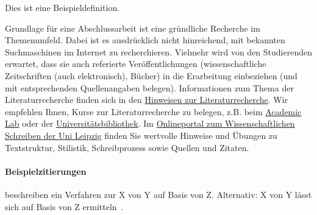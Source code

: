 \begin{temp}
\begin{definition}[Beispieldefinition]
Dies ist eine Beispieldefinition.
\end{definition}

Grundlage für eine Abschlussarbeit ist eine gründliche Recherche im Themenumfeld.
Dabei ist es ausdrücklich nicht hinreichend, mit bekannten Suchmaschinen im Internet zu recherchieren.
Vielmehr wird von den Studierenden erwartet, dass sie auch referierte Veröffentlichungen (wissenschaftliche Zeitschriften (auch elektronisch), Bücher) in die Erarbeitung einbeziehen (und mit entsprechenden Quellenangaben belegen).
Informationen zum Thema der Literaturrecherche finden sich in den \href{http://www.imise.uni-leipzig.de/Lehre/MedInf/Abschlussarbeiten/Literaturrecherche}{Hinweisen zur Literaturrecherche}.
Wir empfehlen Ihnen, Kurse zur Literaturrecherche zu belegen, z.B. beim \href{https://home.uni-leipzig.de/academiclab/}{Academic Lab} oder der \href{https://www.ub.uni-leipzig.de/service/workshops-und-online-tutorials/}{Universitätsbibliothek}.
Im \href{https://home.uni-leipzig.de/schreibportal/}{Onlineportal zum Wissenschaftlichen Schreiben der Uni Leipzig} finden Sie wertvolle Hinweise und Übungen zu Textstruktur, Stilistik, Schreibprozess sowie Quellen und Zitaten.

\paragraph{Beispielzitierungen}
\citet{sniktec} beschreiben ein Verfahren zur X von Y auf Basis von Z.
Alternativ: X von Y lässt sich auf Basis von Z ermitteln~\citep{sniktec}.

\end{temp}
